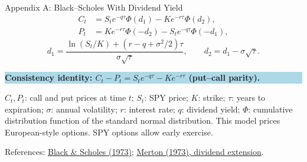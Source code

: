 \documentclass[10pt,aspectratio=169]{beamer}
\newcommand{\softbox}[1]{\colorbox{LightBlue}{\parbox{0.93\linewidth}{\vspace{0.10cm}#1\vspace{0.10cm}}}}
\begin{document}
\begin{frame}{Appendix A: Black--Scholes With Dividend Yield}
\vspace{0.08cm}
\[
\begin{aligned}
C_t &= S_t e^{-q\tau}\Phi(d_1)-K e^{-r\tau}\Phi(d_2),\\[0.12cm]
P_t &= K e^{-r\tau}\Phi(-d_2)-S_t e^{-q\tau}\Phi(-d_1),
\end{aligned}
\]
\[
d_1=\frac{\ln(S_t/K)+(r-q+\sigma^2/2)\tau}{\sigma\sqrt{\tau}},
\qquad d_2=d_1-\sigma\sqrt{\tau}.
\]
\vspace{0.06cm}
\softbox{\small\bfseries Consistency identity: \quad $C_t-P_t=S_t e^{-q\tau}-Ke^{-r\tau}$ \quad (put--call parity).}\par
\vspace{0.26cm}
{\small $C_t,P_t$: call and put prices at time $t$; $S_t$: SPY price; $K$: strike; $\tau$: years to expiration; $\sigma$: annual volatility; $r$: interest rate; $q$: dividend yield; $\Phi$: cumulative distribution function of the standard normal distribution.}
\vfill
{\small\color{GraphGray}This model prices European-style options. SPY options allow early exercise.}\par
\vspace{0.12cm}
{\footnotesize References:
\href{https://doi.org/10.1086/260062}{\textcolor{AccentBlue}{Black \& Scholes (1973)}};
\href{https://doi.org/10.2307/3003143}{\textcolor{AccentBlue}{Merton (1973), dividend extension}}.}
\end{frame}
\end{document}
